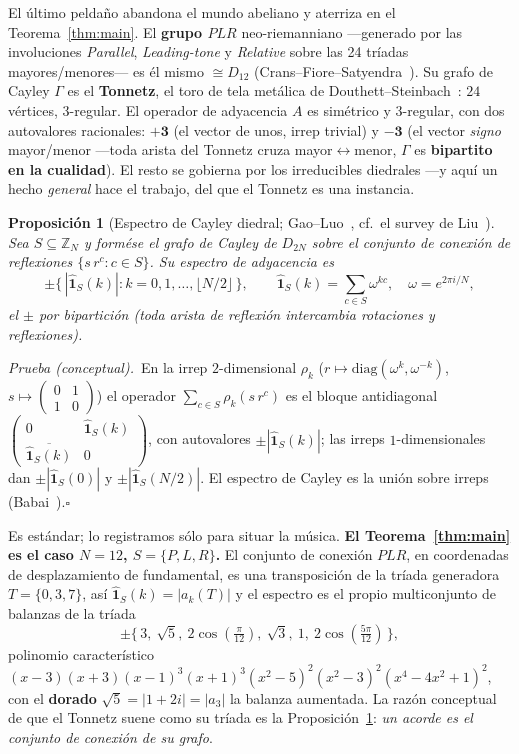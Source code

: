 \documentclass[11pt]{article}
\newtheorem{proposition}{Proposici\'on}
\newcommand{\Zn}[1]{\mathbb{Z}_{#1}}
\begin{document}
El \'ultimo pelda\~no abandona el mundo abeliano y aterriza en el Teorema~\ref{thm:main}. El \textbf{grupo
$PLR$} neo-riemanniano ---generado por las
involuciones \emph{Parallel}, \emph{Leading-tone} y \emph{Relative} sobre las 24 tr\'iadas mayores/menores---
es \'el mismo $\cong D_{12}$ (Crans--Fiore--Satyendra~\cite{CFS}). Su grafo de Cayley $\Gamma$ es el
\textbf{Tonnetz}, el toro de tela met\'alica de Douthett--Steinbach~\cite{DS}: $24$ v\'ertices, $3$-regular.
El operador de adyacencia $A$ es sim\'etrico y $3$-regular, con dos autovalores racionales: $\mathbf{+3}$ (el
vector de unos, irrep trivial) y $\mathbf{-3}$ (el vector \emph{signo} mayor/menor ---toda arista del
Tonnetz cruza mayor$\leftrightarrow$menor, $\Gamma$ es \textbf{bipartito en la cualidad}). El resto se
gobierna por los irreducibles diedrales ---y aqu\'i un hecho \emph{general} hace el trabajo, del que el
Tonnetz es una instancia.

\begin{proposition}[Espectro de Cayley diedral; Gao--Luo~\cite{GaoLuo}, cf.\ el survey de Liu~\cite{LiuSurvey}]\label{prop:dihedral}
Sea $S\subseteq\Zn{N}$ y form\'ese el grafo de Cayley de $D_{2N}$ sobre el conjunto de conexi\'on de
\emph{reflexiones} $\{s\,r^{c}:c\in S\}$. Su espectro de adyacencia es
\[
  \pm\bigl\{\,|\hat{\mathbf 1}_S(k)|:k=0,1,\dots,\lfloor N/2\rfloor\,\bigr\},\qquad
  \hat{\mathbf 1}_S(k)=\sum_{c\in S}\omega^{kc},\quad \omega=e^{2\pi i/N},
\]
el $\pm$ por bipartici\'on (toda arista de reflexi\'on intercambia rotaciones y reflexiones).
\end{proposition}
\noindent\textit{Prueba (conceptual).}~En la irrep $2$-dimensional $\rho_k$
($r\mapsto\mathrm{diag}(\omega^{k},\omega^{-k})$, $s\mapsto\left(\begin{smallmatrix}0&1\\1&0\end{smallmatrix}\right)$)
el operador $\sum_{c\in S}\rho_k(s\,r^{c})$ es el bloque antidiagonal
$\left(\begin{smallmatrix}0&\hat{\mathbf 1}_S(k)\\[1pt]\overline{\hat{\mathbf 1}_S(k)}&0\end{smallmatrix}\right)$,
con autovalores $\pm|\hat{\mathbf 1}_S(k)|$; las irreps $1$-dimensionales dan $\pm|\hat{\mathbf 1}_S(0)|$ y
$\pm|\hat{\mathbf 1}_S(N/2)|$. El espectro de Cayley es la uni\'on sobre irreps (Babai~\cite{Babai}).\hfill$\square$

\smallskip\noindent Es est\'andar; lo registramos s\'olo para situar la m\'usica. \textbf{El
Teorema~\ref{thm:main} es el caso $N=12$, $S=\{P,L,R\}$.} El conjunto de conexi\'on $PLR$, en coordenadas de
desplazamiento de fundamental, es una transposici\'on de la tr\'iada generadora $T=\{0,3,7\}$, as\'i
$\hat{\mathbf 1}_S(k)=|a_k(T)|$ y el espectro es el propio multiconjunto de balanzas de la tr\'iada
\[
  \pm\{\,3,\ \sqrt5,\ 2\cos(\tfrac{\pi}{12}),\ \sqrt3,\ 1,\ 2\cos(\tfrac{5\pi}{12})\,\},
\]
polinomio caracter\'istico $(x-3)(x+3)(x-1)^3(x+1)^3(x^2-5)^2(x^2-3)^2(x^4-4x^2+1)^2$, con el \textbf{dorado}
$\sqrt5=|1+2i|=|a_3|$ la balanza aumentada. La raz\'on conceptual de que el Tonnetz suene como su tr\'iada es
la Proposici\'on~\ref{prop:dihedral}: \emph{un acorde es el conjunto de conexi\'on de su grafo}.
\end{document}
